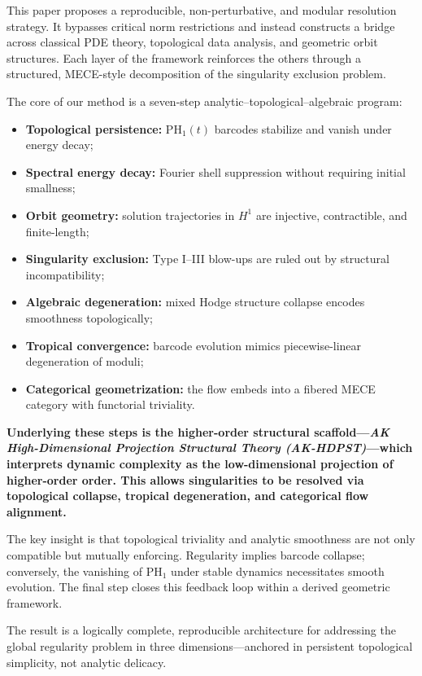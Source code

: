 \documentclass[11pt]{article}
\theoremstyle{definition}
\begin{document}
This paper proposes a reproducible, non-perturbative, and modular resolution strategy. It bypasses critical norm restrictions and instead constructs a bridge across classical PDE theory, topological data analysis, and geometric orbit structures. Each layer of the framework reinforces the others through a structured, MECE-style decomposition of the singularity exclusion problem.

The core of our method is a seven-step analytic–topological–algebraic program:
\begin{itemize}
  \item \textbf{Topological persistence:} $\mathrm{PH}_1(t)$ barcodes stabilize and vanish under energy decay;
  \item \textbf{Spectral energy decay:} Fourier shell suppression without requiring initial smallness;
  \item \textbf{Orbit geometry:} solution trajectories in $H^1$ are injective, contractible, and finite-length;
  \item \textbf{Singularity exclusion:} Type I–III blow-ups are ruled out by structural incompatibility;
  \item \textbf{Algebraic degeneration:} mixed Hodge structure collapse encodes smoothness topologically;
  \item \textbf{Tropical convergence:} barcode evolution mimics piecewise-linear degeneration of moduli;
  \item \textbf{Categorical geometrization:} the flow embeds into a fibered MECE category with functorial triviality.
\end{itemize}

\textbf{Underlying these steps is the higher-order structural scaffold---\textit{AK High-Dimensional Projection Structural Theory (AK-HDPST)}---which interprets dynamic complexity as the low-dimensional projection of higher-order order. This allows singularities to be resolved via topological collapse, tropical degeneration, and categorical flow alignment.}

The key insight is that topological triviality and analytic smoothness are not only compatible but mutually enforcing. Regularity implies barcode collapse; conversely, the vanishing of $\mathrm{PH}_1$ under stable dynamics necessitates smooth evolution. The final step closes this feedback loop within a derived geometric framework.

The result is a logically complete, reproducible architecture for addressing the global regularity problem in three dimensions—anchored in persistent topological simplicity, not analytic delicacy.
\end{document}
